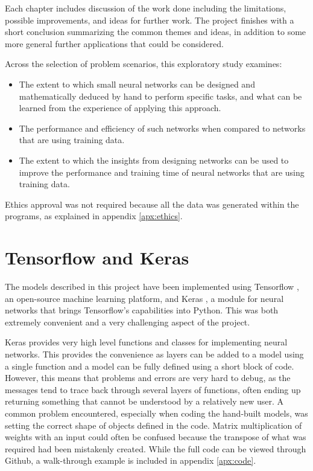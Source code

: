 \documentclass{somasmsc}
\begin{document}
Each chapter includes discussion of the work done including the limitations, possible improvements, and ideas for further work. The project finishes with a short conclusion summarizing the common themes and ideas, in addition to some more general further applications that could be considered.

Across the selection of problem scenarios, this exploratory study examines:
\begin{itemize}
    \item The extent to which small neural networks can be designed and mathematically deduced by hand to perform specific tasks, and what can be learned from the experience of applying this approach.
    \item The performance and efficiency of such networks when compared to networks that are using training data.
    \item The extent to which the insights from designing networks can be used to improve the performance and training time of neural networks that are using training data.
\end{itemize}

Ethics approval was not required because all the data was generated within the programs, as explained in appendix \ref{apx:ethics}.

\section{Tensorflow and Keras}

The models described in this project have been implemented using Tensorflow \citep{tensorflow2015-whitepaper}, an open-source machine learning platform, and Keras \citep{chollet2015keras}, a module for neural networks that brings Tensorflow's capabilities into Python. This was both extremely convenient and a very challenging aspect of the project.

Keras provides very high level functions and classes for implementing neural networks. This provides the convenience as layers can be added to a model using a single function and a model can be fully defined using a short block of code. However, this means that problems and errors are very hard to debug, as the messages tend to trace back through several layers of functions, often ending up returning something that cannot be understood by a relatively new user. A common problem encountered, especially when coding the hand-built models, was setting the correct shape of objects defined in the code. Matrix multiplication of weights with an input could often be confused because the transpose of what was required had been mistakenly created. While the full code can be viewed through Github, a walk-through example is included in appendix \ref{apx:code}.
\end{document}
